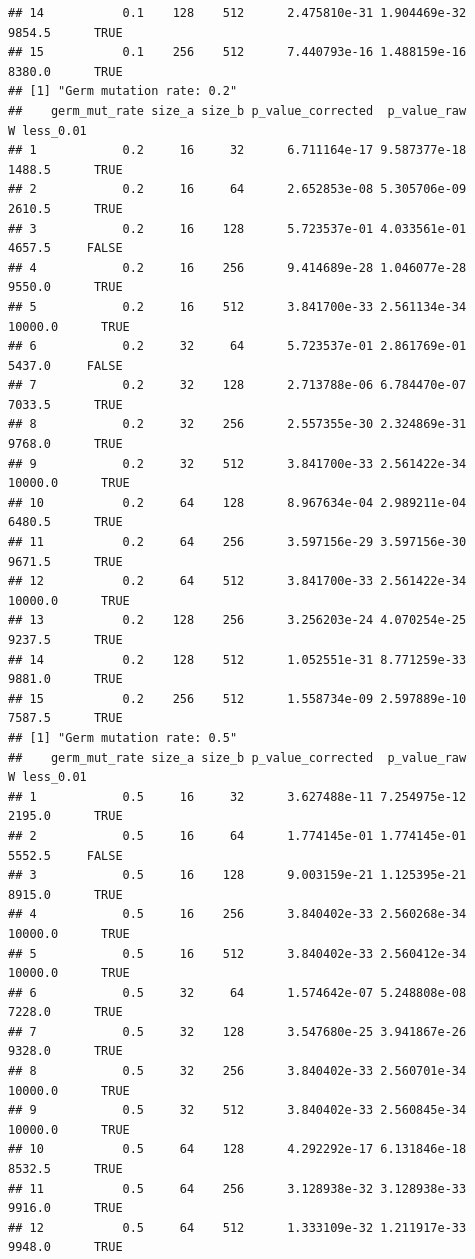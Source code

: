 \documentclass[
]{book}
\begin{document}
\begin{verbatim}
## 14           0.1    128    512      2.475810e-31 1.904469e-32 9854.5      TRUE
## 15           0.1    256    512      7.440793e-16 1.488159e-16 8380.0      TRUE
## [1] "Germ mutation rate: 0.2"
##    germ_mut_rate size_a size_b p_value_corrected  p_value_raw       W less_0.01
## 1            0.2     16     32      6.711164e-17 9.587377e-18  1488.5      TRUE
## 2            0.2     16     64      2.652853e-08 5.305706e-09  2610.5      TRUE
## 3            0.2     16    128      5.723537e-01 4.033561e-01  4657.5     FALSE
## 4            0.2     16    256      9.414689e-28 1.046077e-28  9550.0      TRUE
## 5            0.2     16    512      3.841700e-33 2.561134e-34 10000.0      TRUE
## 6            0.2     32     64      5.723537e-01 2.861769e-01  5437.0     FALSE
## 7            0.2     32    128      2.713788e-06 6.784470e-07  7033.5      TRUE
## 8            0.2     32    256      2.557355e-30 2.324869e-31  9768.0      TRUE
## 9            0.2     32    512      3.841700e-33 2.561422e-34 10000.0      TRUE
## 10           0.2     64    128      8.967634e-04 2.989211e-04  6480.5      TRUE
## 11           0.2     64    256      3.597156e-29 3.597156e-30  9671.5      TRUE
## 12           0.2     64    512      3.841700e-33 2.561422e-34 10000.0      TRUE
## 13           0.2    128    256      3.256203e-24 4.070254e-25  9237.5      TRUE
## 14           0.2    128    512      1.052551e-31 8.771259e-33  9881.0      TRUE
## 15           0.2    256    512      1.558734e-09 2.597889e-10  7587.5      TRUE
## [1] "Germ mutation rate: 0.5"
##    germ_mut_rate size_a size_b p_value_corrected  p_value_raw       W less_0.01
## 1            0.5     16     32      3.627488e-11 7.254975e-12  2195.0      TRUE
## 2            0.5     16     64      1.774145e-01 1.774145e-01  5552.5     FALSE
## 3            0.5     16    128      9.003159e-21 1.125395e-21  8915.0      TRUE
## 4            0.5     16    256      3.840402e-33 2.560268e-34 10000.0      TRUE
## 5            0.5     16    512      3.840402e-33 2.560412e-34 10000.0      TRUE
## 6            0.5     32     64      1.574642e-07 5.248808e-08  7228.0      TRUE
## 7            0.5     32    128      3.547680e-25 3.941867e-26  9328.0      TRUE
## 8            0.5     32    256      3.840402e-33 2.560701e-34 10000.0      TRUE
## 9            0.5     32    512      3.840402e-33 2.560845e-34 10000.0      TRUE
## 10           0.5     64    128      4.292292e-17 6.131846e-18  8532.5      TRUE
## 11           0.5     64    256      3.128938e-32 3.128938e-33  9916.0      TRUE
## 12           0.5     64    512      1.333109e-32 1.211917e-33  9948.0      TRUE

\end{verbatim}
\end{document}
